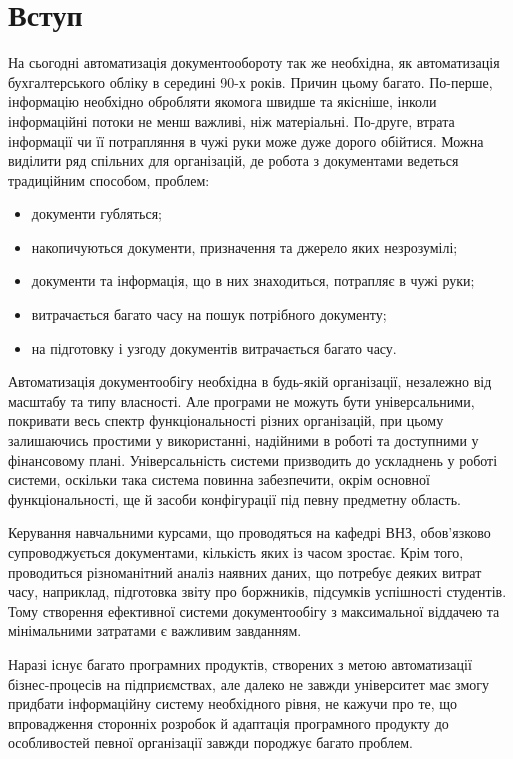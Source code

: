 \section*{Вступ}
\bigbreak
\begin{sloppy}
На сьогодні автоматизація документообороту так же необхідна, як автоматизація бухгалтерського обліку в середині 90-х років. Причин цьому багато. По-перше, інформацію необхідно обробляти якомога швидше та якісніше, інколи інформаційні потоки не менш важливі, ніж матеріальні. По-друге, втрата інформації чи її потрапляння в чужі руки може дуже дорого обійтися. Можна виділити ряд спільних для організацій, де робота з документами ведеться традиційним способом, проблем:
\begin{itemize}
\item документи губляться;
\item накопичуються документи, призначення та джерело яких незрозумілі;
\item документи та інформація, що в них знаходиться, потрапляє в чужі руки;
\item витрачається багато часу на пошук потрібного документу;
\item на підготовку і узгоду документів витрачається багато часу.
\end{itemize}

Автоматизація документообігу необхідна в будь-якій організації, незалежно від масштабу та типу власності. Але програми не можуть бути універсальними, покривати весь спектр функціональності різних організацій, при цьому залишаючись простими у використанні, надійними в роботі та доступними у фінансовому плані. Універсальність системи призводить до ускладнень у роботі системи, оскільки така система повинна забезпечити, окрім основної функціональності, ще й засоби конфігурації під певну предметну область.

Керування навчальними курсами, що проводяться на кафедрі ВНЗ, обов'язково супроводжується документами, кількість яких із часом зростає. Крім того, проводиться різноманітний аналіз наявних даних, що потребує деяких витрат часу, наприклад, підготовка звіту про боржників, підсумків успішності студентів. Тому створення ефективної системи документообігу з максимальної віддачею та мінімальними затратами є важливим завданням.

Наразі існує багато програмних продуктів, створених з метою автоматизації бізнес-процесів на підприємствах, але далеко не завжди університет має змогу придбати інформаційну систему необхідного рівня, не кажучи про те, що впровадження сторонніх розробок й адаптація програмного продукту до особливостей певної організації завжди породжує багато проблем.


\end{sloppy}

